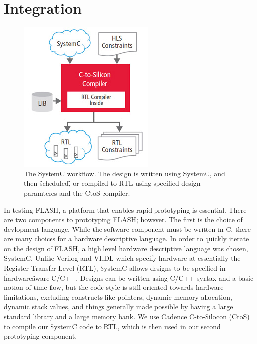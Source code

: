\documentclass{sig-alternate-10pt}
\begin{document}
\section{Integration}
\label{sec:integration}
\begin{figure}
	\begin{center}
		\includegraphics[width=0.9\linewidth]{fig/hlsctos.jpg}
		\caption{
			The SystemC workflow. The design is written using SystemC, and then \"scheduled\", or compiled to RTL using specified design paramteres and the CtoS compiler.
		}
		\label{fig:ctos_overview}
	\end{center}
\end{figure}

In testing FLASH, a platform that enables rapid prototyping is essential. There are two components to prototyping FLASH; however. The first is the choice of devlopment language. While the software component must be written in C, there are many choices for a hardware descriptive language. In order to quickly iterate on the design of FLASH, a high level hardware descriptive language was chosen, SystemC. Unlike Verilog and VHDL which specify hardware at essentially the Register Transfer Level (RTL), SystemC allows designs to be specified in \"hardware\" aware C/C++. Designs can be written using C/C++ syntax and a basic notion of time flow, but the code style is still oriented towards hardware limitations, excluding constructs like pointers, dynamic memory allocation, dynamic stack values, and things generally made possible by having a large standard library and a large memory bank. We use Cadence C-to-Silocon (CtoS) to compile our SystemC code to RTL, which is then used in our second prototyping component.
\end{document}
